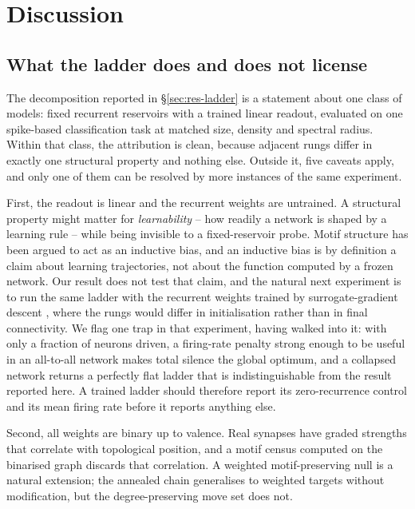 \section{Discussion}

\subsection{What the ladder does and does not license}

The decomposition reported in \S\ref{sec:res-ladder} is a statement about one class of
models: fixed recurrent reservoirs with a trained linear readout, evaluated on one
spike-based classification task at matched size, density and spectral radius. Within
that class, the attribution is clean, because adjacent rungs differ in exactly one
structural property and nothing else. Outside it, five caveats apply, and only one of them
can be resolved by more instances of the same experiment.

First, the readout is linear and the recurrent weights are untrained. A structural
property might matter for \emph{learnability} -- how readily a network is shaped by a
learning rule -- while being invisible to a fixed-reservoir probe. Motif structure has
been argued to act as an inductive bias, and an inductive bias is by definition a claim
about learning trajectories, not about the function computed by a frozen network. Our
result does not test that claim, and the natural next experiment is to run the same
ladder with the recurrent weights trained by surrogate-gradient descent
\cite{neftci2019surrogate,zenke2021remarkable}, where the rungs would differ in
initialisation rather than in final connectivity. We flag one trap in that experiment,
having walked into it: with only a fraction of neurons driven, a firing-rate penalty
strong enough to be useful in an all-to-all network makes total silence the global
optimum, and a collapsed network returns a perfectly flat ladder that is
indistinguishable from the result reported here. A trained ladder should therefore
report its zero-recurrence control and its mean firing rate before it reports anything
else.

Second, all weights are binary up to valence. Real synapses have graded strengths that
correlate with topological position, and a motif census computed on the binarised graph
discards that correlation. A weighted motif-preserving null is a natural extension; the
annealed chain generalises to weighted targets without modification, but the
degree-preserving move set does not.

